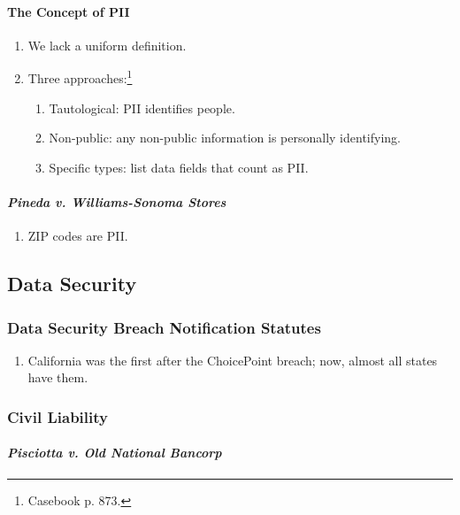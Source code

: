 \paragraph{The Concept of PII}

\begin{enumerate}
    \item We lack a uniform definition.
    \item Three approaches:\footnote{Casebook p. 873.}
    \begin{enumerate}
        \item Tautological: PII identifies people.
        \item Non-public: any non-public information is personally identifying.
        \item Specific types: list data fields that count as PII.
    \end{enumerate}
\end{enumerate}

\paragraph{\emph{Pineda v. Williams-Sonoma Stores}}

\begin{enumerate}
    \item ZIP codes are PII.
\end{enumerate}

\subsection{Data Security}

\subsubsection{Data Security Breach Notification Statutes}

\begin{enumerate}
    \item California was the first after the ChoicePoint breach; now, almost all 
    states have them.
\end{enumerate}

\subsubsection{Civil Liability}

\paragraph{\emph{Pisciotta v. Old National Bancorp}}

